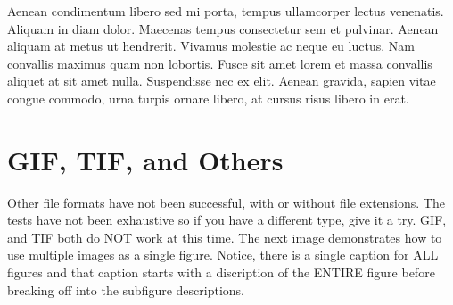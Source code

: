 Aenean condimentum libero sed mi porta, tempus ullamcorper lectus venenatis. Aliquam in diam dolor. Maecenas tempus consectetur sem et pulvinar. Aenean aliquam at metus ut hendrerit. Vivamus molestie ac neque eu luctus. Nam convallis maximus quam non lobortis. Fusce sit amet lorem et massa convallis aliquet at sit amet nulla. Suspendisse nec ex elit. Aenean gravida, sapien vitae congue commodo, urna turpis ornare libero, at cursus risus libero in erat. \cite{Rust94}

\section{GIF, TIF, and Others}

Other file formats have not been successful, with or without file extensions. The tests have not been exhaustive so if you have a different type, give it a try. GIF, and TIF both do NOT work at this time. The next image demonstrates how to use multiple images as a single figure. Notice, there is a single caption for ALL figures and that caption starts with a discription of the ENTIRE figure before breaking off into the subfigure descriptions.

